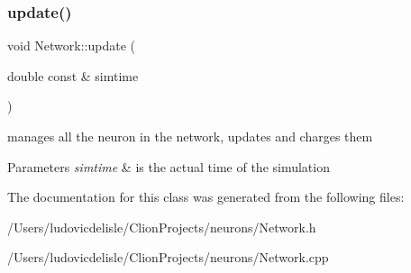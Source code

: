 \subsubsection{\texorpdfstring{update()}{update()}}
{\footnotesize\ttfamily void Network\+::update (\begin{DoxyParamCaption}\item[{double const \&}]{simtime }\end{DoxyParamCaption})}

manages all the neuron in the network, updates and charges them 
\begin{DoxyParams}{Parameters}
{\em simtime} & is the actual time of the simulation \\
\hline
\end{DoxyParams}


The documentation for this class was generated from the following files\+:\begin{DoxyCompactItemize}
\item 
/\+Users/ludovicdelisle/\+Clion\+Projects/neurons/Network.\+h\item 
/\+Users/ludovicdelisle/\+Clion\+Projects/neurons/Network.\+cpp\end{DoxyCompactItemize}
